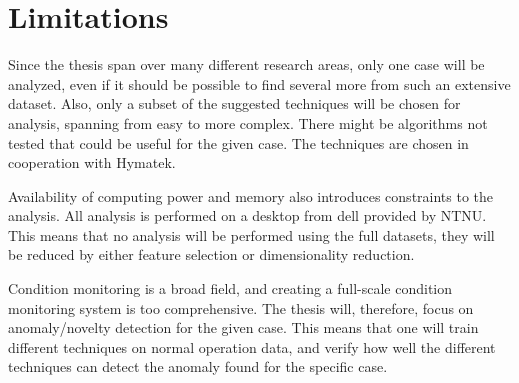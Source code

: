     
    
    

\section{Limitations}\label{sec:assumptions}
    Since the thesis span over many different research areas, only one case will be analyzed, even if it should be possible to find several more from such an extensive dataset. Also, only a subset of the suggested techniques will be chosen for analysis, spanning from easy to more complex. There might be algorithms not tested that could be useful for the given case. The techniques are chosen in cooperation with Hymatek. 
    
    Availability of computing power and memory also introduces constraints to the analysis. All analysis is performed on a desktop from dell provided by NTNU. This means that no analysis will be performed using the full datasets, they will be reduced by either feature selection or dimensionality reduction. 
    
    Condition monitoring is a broad field, and creating a full-scale condition monitoring system is too comprehensive. The thesis will, therefore, focus on anomaly/novelty detection for the given case. This means that one will train different techniques on normal operation data, and verify how well the different techniques can detect the anomaly found for the specific case. 
    
